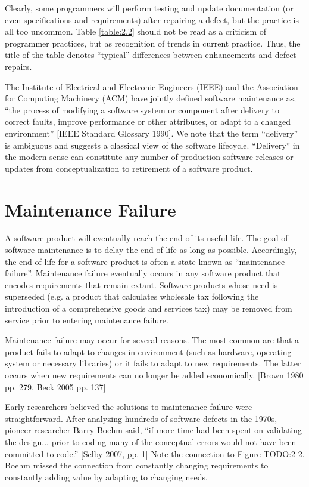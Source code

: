 Clearly, some programmers will perform testing and update documentation (or even specifications and requirements) after repairing a defect, but the practice is all too uncommon.  Table \ref{table:2.2} should not be read as a criticism of programmer practices, but as recognition of trends in current practice.  Thus, the title of the table denotes ``typical'' differences between enhancements and defect repairs.

The Institute of Electrical and Electronic Engineers (IEEE) and the Association for Computing Machinery (ACM) have jointly defined software maintenance as, ``the process of modifying a software system or component after delivery to correct faults, improve performance or other attributes, or adapt to a changed environment'' [IEEE Standard Glossary 1990].  We note that the term ``delivery'' is ambiguous and suggests a classical view of the software lifecycle.  ``Delivery'' in the modern sense can constitute any number of production software releases or updates from conceptualization to retirement of a software product.


\section{Maintenance Failure}

A software product will eventually reach the end of its useful life.  The goal of software maintenance is to delay the end of life as long as possible.  Accordingly, the end of life for a software product is often a state known as ``maintenance failure''.  Maintenance failure eventually occurs in any software product that encodes requirements that remain extant.  Software products whose need is superseded (e.g. a product that calculates wholesale tax following the introduction of a comprehensive goods and services tax) may be removed from service prior to entering maintenance failure.

Maintenance failure may occur for several reasons.  The most common are that a product fails to adapt to changes in environment (such as hardware, operating system or necessary libraries) or it fails to adapt to new requirements.  The latter occurs when new requirements can no longer be added economically. [Brown 1980 pp. 279, Beck 2005 pp. 137]

Early researchers believed the solutions to maintenance failure were straightforward. After analyzing hundreds of software defects in the 1970s, pioneer researcher Barry Boehm said, ``if more time had been spent on validating the design... prior to coding many of the conceptual errors would not have been committed to code.'' [Selby 2007, pp. 1]  Note the connection to Figure TODO:2-2.  Boehm missed the connection from constantly changing requirements to constantly adding value by adapting to changing needs.

